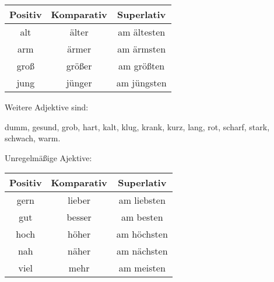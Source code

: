 \begin{tabular}{|c|c|c|}
\hline
Positiv & Komparativ & Superlativ \\
\hline
alt & \"alter & am \"altesten \\
arm & \"armer & am \"armsten \\
gro\ss & gr\"o\ss er & am gr\"o\ss ten \\
jung & j\"unger & am j\"ungsten \\
\hline
\end {tabular}

Weitere Adjektive sind:

dumm, gesund, grob, hart, kalt, klug, krank, kurz, lang, rot, scharf, stark, schwach, warm. 

Unregelm\"a\ss ige Ajektive:
\begin{longtable}{|c|c|c|}
\hline
Positiv & Komparativ & Superlativ \\
\hline\endhead
\hline\endfoot
gern & lieber & am liebsten \\
gut & besser & am besten \\
hoch & h\"oher & am h\"ochsten \\
nah & n\"aher & am n\"achsten \\
viel & mehr & am meisten \\
\end{longtable}
